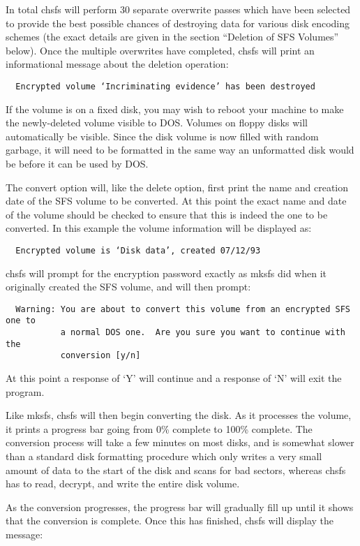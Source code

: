 In total chsfs will perform 30 separate overwrite passes which have been
selected to provide the best possible chances of destroying data for various
disk encoding schemes (the exact details are given in the section ``Deletion of
SFS Volumes'' below).  Once the multiple overwrites have completed, chsfs will
print an informational message about the deletion operation:

{\tt \verb|  |Encrypted volume `Incriminating evidence' has been destroyed}

If the volume is on a fixed disk, you may wish to reboot your machine to make
the newly-deleted volume visible to DOS.  Volumes on floppy disks will
automatically be visible.  Since the disk volume is now filled with random
garbage, it will need to be formatted in the same way an unformatted disk would
be before it can be used by DOS.

The convert option will, like the delete option, first print the name and
creation date of the SFS volume to be converted.  At this point the exact name
and date of the volume should be checked to ensure that this is indeed the one
to be converted.  In this example the volume information will be displayed as:

{\tt \verb|  |Encrypted volume is `Disk data', created 07/12/93}

chsfs will prompt for the encryption password exactly as mksfs did when it
originally created the SFS volume, and will then prompt:
{\small

\begin{verbatim}
  Warning: You are about to convert this volume from an encrypted SFS one to
           a normal DOS one.  Are you sure you want to continue with the
           conversion [y/n]
\end{verbatim}

}
At this point a response of `Y' will continue and a response of `N' will exit
the program.

Like mksfs, chsfs will then begin converting the disk.  As it processes the
volume, it prints a progress bar going from 0\% complete to 100\% complete.  The
conversion process will take a few minutes on most disks, and is somewhat
slower than a standard disk formatting procedure which only writes a very small
amount of data to the start of the disk and scans for bad sectors, whereas 
chsfs has to read, decrypt, and write the entire disk volume.

As the conversion progresses, the progress bar will gradually fill up until it
shows that the conversion is complete.  Once this has finished, chsfs will
display the message:

